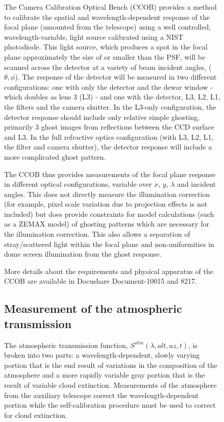 \documentclass[12pt,preprint]{aastex}
\begin{document}
\begin{figure}[htbp]
{

The Camera Calibration Optical Bench (CCOB) provides a method to
calibrate the spatial and wavelength-dependent response of the focal
plane (umounted from the telescope) using a well controlled,
wavelength-variable, light source calibrated using a NIST
photodiode. This light source, which produces a spot in the focal
plane approximately the size of or smaller than the PSF, will be
scanned across the detector at a variety of beam incident angles, ($\theta,\phi$). The
response of the detector will be measured in two different
configurations: one with only the detector and the dewar window -
which doubles as lens 3 (L3) - and one with the detector, L3, L2, L1,
the filters and the camera shutter. In the L3-only configuration, the
detector response should include only relative simple ghosting,
primarily 3 ghost images from reflections between the CCD surface and
L3. In the full refractive optics configuration (with L3, L2, L1, the
filter and camera shutter), the detector response will include a more
complicated ghost pattern.

The CCOB thus provides measurements of the focal plane response in
different optical configurations, variable over $x$, $y$, $\lambda$ and incident
angles. This does not directly measure the illumination
correction (for example, pixel scale variation due to projection
effects is not included) but does provide constraints for model
calculations (such as a ZEMAX model) of ghosting patterns which are
necessary for the illumination correction. This also allows a
separation of stray/scattered light within the focal plane and
non-uniformities in dome screen illumination from the ghost response.

More details about the requirements and physical apparatus of the CCOB
are available in Docushare Document-10015 and 8217.

\subsection{Measurement of the atmospheric transmission} 

The atmospheric transmission function, $S^{atm}(\lambda,alt,az,t)$, is
broken into two parts: a wavelength-dependent, slowly varying portion
that is the end result of variations in the composition of the
atmosphere and a more rapidly variable gray portion that is the result
of variable cloud extinction. Measurements of the atmosphere from the
auxiliary telescope correct the wavelength-dependent portion while the
self-calibration procedure must be used to correct for cloud
extinction. 

}
\end{figure}
\end{document}
